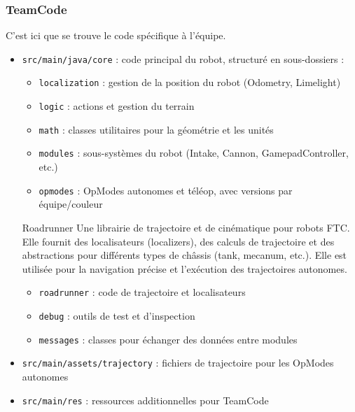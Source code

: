\documentclass[12pt, a4paper]{report}
\begin{document}
    \subsubsection*{TeamCode}
    C’est ici que se trouve le code spécifique à l’équipe.
    \begin{itemize}
        \item \texttt{src/main/java/core} : code principal du robot, structuré en sous-dossiers :
        \begin{itemize}
            \item \texttt{localization} : gestion de la position du robot (Odometry, Limelight)
            \item \texttt{logic} : actions et gestion du terrain
            \item \texttt{math} : classes utilitaires pour la géométrie et les unités
            \item \texttt{modules} : sous-systèmes du robot (Intake, Cannon, GamepadController, etc.)
            \item \texttt{opmodes} : OpModes autonomes et téléop, avec versions par équipe/couleur
        \end{itemize}

        \begin{mydefinition}{Roadrunner}
            Une librairie de trajectoire et de cinématique pour robots FTC. Elle fournit des localisateurs (localizers), des calculs de trajectoire et des abstractions pour différents types de châssis (tank, mecanum, etc.).
            Elle est utilisée pour la navigation précise et l’exécution des trajectoires autonomes.
        \end{mydefinition}

        \begin{itemize}
            \item \texttt{roadrunner} : code de trajectoire et localisateurs
            \item \texttt{debug} : outils de test et d’inspection
            \item \texttt{messages} : classes pour échanger des données entre modules
        \end{itemize}
        \item \texttt{src/main/assets/trajectory} : fichiers de trajectoire pour les OpModes autonomes
        \item \texttt{src/main/res} : ressources additionnelles pour TeamCode
    \end{itemize}
\end{document}
